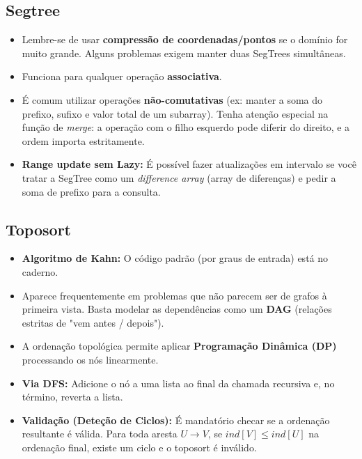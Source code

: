 \documentclass[10pt,a4paper,twocolumn]{article}
\begin{document}
\subsection{Segtree}
\begin{itemize}
    \item Lembre-se de usar \textbf{compressão de coordenadas/pontos} se o domínio for muito grande. Alguns problemas exigem manter duas SegTrees simultâneas.
    \item Funciona para qualquer operação \textbf{associativa}.
    \item É comum utilizar operações \textbf{não-comutativas} (ex: manter a soma do prefixo, sufixo e valor total de um subarray). Tenha atenção especial na função de \textit{merge}: a operação com o filho esquerdo pode diferir do direito, e a ordem importa estritamente.
    \item \textbf{Range update sem Lazy:} É possível fazer atualizações em intervalo se você tratar a SegTree como um \textit{difference array} (array de diferenças) e pedir a soma de prefixo para a consulta.
\end{itemize}

\subsection{Toposort}
\begin{itemize}
    \item \textbf{Algoritmo de Kahn:} O código padrão (por graus de entrada) está no caderno.
    \item Aparece frequentemente em problemas que não parecem ser de grafos à primeira vista. Basta modelar as dependências como um \textbf{DAG} (relações estritas de "vem antes / depois").
    \item A ordenação topológica permite aplicar \textbf{Programação Dinâmica (DP)} processando os nós linearmente.
    \item \textbf{Via DFS:} Adicione o nó a uma lista ao final da chamada recursiva e, no término, reverta a lista.
    \item \textbf{Validação (Deteção de Ciclos):} É mandatório checar se a ordenação resultante é válida. Para toda aresta $U \to V$, se $ind[V] \le ind[U]$ na ordenação final, existe um ciclo e o toposort é inválido.
\end{itemize}

\endgroup
\end{document}
